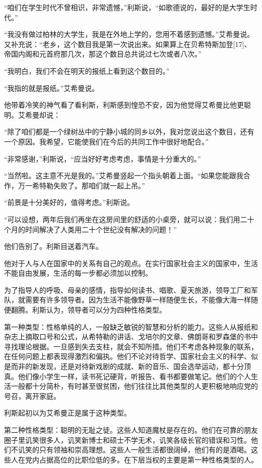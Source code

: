 “咱们在学生时代不曾相识，非常遗憾，”利斯说，“如歌德说的，最好的是大学生时代。”

“我没有做过柏林的大学生，我是在外地上学的，您用不着感到遗憾。”艾希曼说。又补充说：“老乡，这个数目我是第一次说出来。如果算上在贝希特斯加登[17]、帝国内阁和元首府那几次，那这个数目总共说过七次或者八次。”

“我明白，我们不会在明天的报纸上看到这个数目的。”

“我指的就是报纸。”艾希曼说。

他带着冷笑的神气看了看利斯，利斯感到惶恐不安，因为他觉得艾希曼比他更聪明。艾希曼却说：

“除了咱们都是一个绿树丛中的宁静小城的同乡以外，我对您说出这个数目，还有一个原因。我希望，它能使我们在今后的共同工作中很好地配合。”

“非常感谢，”利斯说，“应当好好考虑考虑，事情是十分重大的。”

“当然啦。这主意不光是我的。”艾希曼竖起一个指头朝着上面。“如果您能跟我合作，万一希特勒失败了。那咱们就一起上吊。”

“前景是十分美好的，值得考虑。”利斯说。

“可以设想，两年后我们再坐在这房间里的舒适的小桌旁，就可以说：我们用二十个月的时间解决了人类用二十个世纪没有解决的问题！”

他们告别了。利斯目送着汽车。

他对于人与人在国家中的关系有自己的观点。在实行国家社会主义的国家中，生活不能自由发展，生活的每一步都必须加以控制。

为了指导人的呼吸、母亲的感情，指导如何读书、唱歌、夏天旅游，领导工厂和军队，就需要有许多领导者。因为生活不能像野草一样随便生长，不能像大海一样随便翻腾。利斯认为，领导者可以分为四种性格类型。

第一种类型：性格单纯的人，一般缺乏敏锐的智慧和分析的能力。这些人从报纸和杂志上摘取口号和公式，从希特勒的讲话、戈培尔的文章、佛朗哥和罗森堡的书中寻找理论根据。一旦感到失去支柱，就会不知所措。他们不考虑各种现象的联系，在任何问题上都表现得激烈和偏执。他们不论对待哲学、国家社会主义的科学、似是而非的新发现，还是对待新戏剧的成就、新的音乐、国会选举运动，都十分顶真。他们像小学生一样，读书死记硬背，听报告、看书都要做笔记。他们的个人生活一般都十分简朴，有时甚至很贫困，他们往往比其他类型的人更积极地响应党的号召，离开家庭。

利斯起初以为艾希曼正是属于这种类型。

第二种性格类型：聪明的无耻之徒。这些人知道魔杖是存在的。他们在可靠的朋友圈子里讥笑很多人，讥笑新博士和硕士不学无术，讥笑各级长官的错误和习性。他们不讥笑的只有领袖和崇高理想。这些人一般生活都很阔绰，他们有的是酒喝。这些人在党内占据高位的比职位低的多。在下层当权的主要是第一种性格类型的人。

